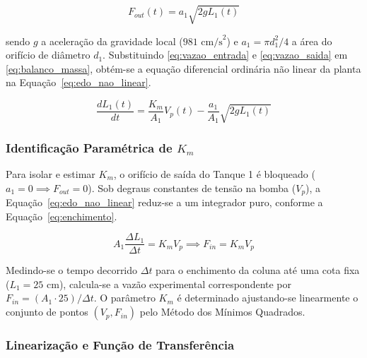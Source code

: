 \documentclass[a4paper,12pt]{article}
\begin{document}
\begin{equation}
    F_{out}(t) = a_1 \sqrt{2g L_1(t)}
    \label{eq:vazao_saida}
\end{equation}

\begin{justify}
    \noindent sendo $g$ a aceleração da gravidade local ($981\text{ cm/s}^2$) e $a_1 = \pi d_1^2 / 4$ a área do orifício de diâmetro $d_1$. Substituindo \eqref{eq:vazao_entrada} e \eqref{eq:vazao_saida} em \eqref{eq:balanco_massa}, obtém-se a equação diferencial ordinária não linear da planta na Equação~\eqref{eq:edo_nao_linear}.
\end{justify}

\begin{equation}
    \frac{dL_1(t)}{dt} = \frac{K_m}{A_1} V_p(t) - \frac{a_1}{A_1} \sqrt{2g L_1(t)}
    \label{eq:edo_nao_linear}
\end{equation}

\subsubsection{Identificação Paramétrica de $K_m$}

\begin{justify}
    \hspace{4ex}Para isolar e estimar $K_m$, o orifício de saída do Tanque 1 é bloqueado ($a_1 = 0 \implies F_{out} = 0$). Sob degraus constantes de tensão na bomba ($V_p$), a Equação~\eqref{eq:edo_nao_linear} reduz-se a um integrador puro, conforme a Equação~\eqref{eq:enchimento}.
\end{justify}

\begin{equation}
    A_1 \frac{\Delta L_1}{\Delta t} = K_m V_p \implies F_{in} = K_m V_p
    \label{eq:enchimento}
\end{equation}

\begin{justify}
    \hspace{4ex}Medindo-se o tempo decorrido $\Delta t$ para o enchimento da coluna até uma cota fixa ($L_{1} = 25\text{ cm}$), calcula-se a vazão experimental correspondente por $F_{in} = (A_1 \cdot 25)/\Delta t$. O parâmetro $K_m$ é determinado ajustando-se linearmente o conjunto de pontos $(V_p, F_{in})$ pelo Método dos Mínimos Quadrados.
\end{justify}

\subsubsection{Linearização e Função de Transferência}
\end{document}
